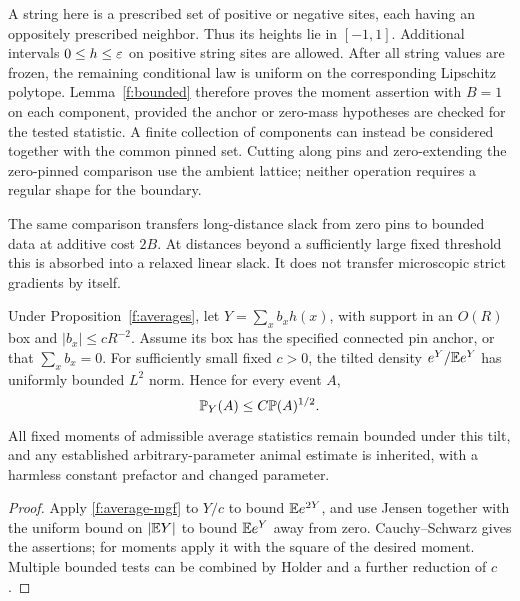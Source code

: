 A string here is a prescribed set of positive or negative sites, each
having an oppositely prescribed neighbor. Thus its heights lie in $[-1,1]$.
Additional intervals $0\le h\le\varepsilon$ on positive string sites are allowed.
After all string values are frozen, the remaining conditional law is
uniform on the corresponding Lipschitz polytope. Lemma~\ref{f:bounded}
therefore proves the moment assertion with $B=1$ on each component, provided
the anchor or zero-mass hypotheses are checked for the tested statistic.
A finite collection of components can instead be considered together
with the common pinned set. Cutting along pins and zero-extending the
zero-pinned comparison use the ambient lattice; neither operation requires
a regular shape for the boundary.

The same comparison transfers long-distance slack from zero pins to bounded
data at additive cost $2B$. At distances beyond a sufficiently large fixed
threshold this is absorbed into a relaxed linear slack. It does not
transfer microscopic strict gradients by itself.

\begin{lemma}\label{f:tilts}
Under Proposition~\ref{f:averages}, let $Y=\sum_x b_xh(x)$, with support
in an $O(R)$ box and $|b_x|\le cR^{-2}$. Assume its box has the specified
connected pin anchor, or that $\sum_xb_x=0$. For sufficiently small fixed
$c>0$, the tilted density $e^Y/\mathbb E e^Y$ has uniformly bounded $L^2$ norm.
Hence for every event $A$,
\[
 \mathbb P_Y(A)\le C\mathbb P(A)^{1/2}.
\]
All fixed moments of admissible average statistics remain bounded under
this tilt, and any established arbitrary-parameter animal estimate is
inherited, with a harmless constant prefactor and changed parameter.
\end{lemma}
\begin{proof}
Apply \eqref{f:average-mgf} to $Y/c$ to bound $\mathbb E e^{2Y}$, and use
Jensen together with the uniform bound on $|\mathbb E Y|$ to bound $\mathbb E e^Y$
away from zero. Cauchy--Schwarz gives the assertions; for moments apply
it with the square of the desired moment. Multiple bounded tests can be
combined by Holder and a further reduction of $c$.
\end{proof}

